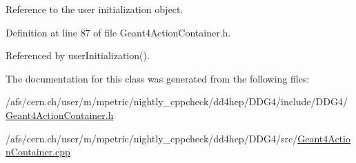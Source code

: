Reference to the user initialization object. 



Definition at line 87 of file Geant4\+Action\+Container.\+h.



Referenced by user\+Initialization().



The documentation for this class was generated from the following files\+:\begin{DoxyCompactItemize}
\item 
/afs/cern.\+ch/user/m/mpetric/nightly\+\_\+cppcheck/dd4hep/\+D\+D\+G4/include/\+D\+D\+G4/\hyperlink{_geant4_action_container_8h}{Geant4\+Action\+Container.\+h}\item 
/afs/cern.\+ch/user/m/mpetric/nightly\+\_\+cppcheck/dd4hep/\+D\+D\+G4/src/\hyperlink{_geant4_action_container_8cpp}{Geant4\+Action\+Container.\+cpp}\end{DoxyCompactItemize}
